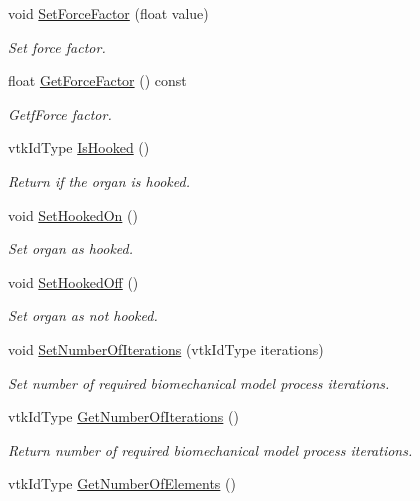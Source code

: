 \begin{DoxyCompactItemize}
void \hyperlink{classvtkOrgan_ae98b19d50a8f351e79e881b579215953}{SetForceFactor} (float value)
\begin{DoxyCompactList}\small\item\em Set force factor. \item\end{DoxyCompactList}\item 
float \hyperlink{classvtkOrgan_a81b39e0f98712affccd17071791f6ad7}{GetForceFactor} () const 
\begin{DoxyCompactList}\small\item\em GetfForce factor. \item\end{DoxyCompactList}\item 
vtkIdType \hyperlink{classvtkOrgan_ad61305759deba9189e2a648c9d083fac}{IsHooked} ()
\begin{DoxyCompactList}\small\item\em Return if the organ is hooked. \item\end{DoxyCompactList}\item 
void \hyperlink{classvtkOrgan_a78a3cdaeb7e6b23de0880dcb1c407cfe}{SetHookedOn} ()
\begin{DoxyCompactList}\small\item\em Set organ as hooked. \item\end{DoxyCompactList}\item 
void \hyperlink{classvtkOrgan_ad2ac78a6020fba61ff49edad8a3f6a22}{SetHookedOff} ()
\begin{DoxyCompactList}\small\item\em Set organ as not hooked. \item\end{DoxyCompactList}\item 
void \hyperlink{classvtkOrgan_a97ed046b7c9b8c3cc87939db46e4ec01}{SetNumberOfIterations} (vtkIdType iterations)
\begin{DoxyCompactList}\small\item\em Set number of required biomechanical model process iterations. \item\end{DoxyCompactList}\item 
vtkIdType \hyperlink{classvtkOrgan_a99aeadb34310d5ad8b7d8616ea8482ef}{GetNumberOfIterations} ()
\begin{DoxyCompactList}\small\item\em Return number of required biomechanical model process iterations. \item\end{DoxyCompactList}\item 
\hypertarget{classvtkOrgan_a6ccc61769a79c60ac30de6c67e170fad}{
vtkIdType \hyperlink{classvtkOrgan_a6ccc61769a79c60ac30de6c67e170fad}{GetNumberOfElements} ()}
\label{classvtkOrgan_a6ccc61769a79c60ac30de6c67e170fad}


\end{DoxyCompactItemize}
